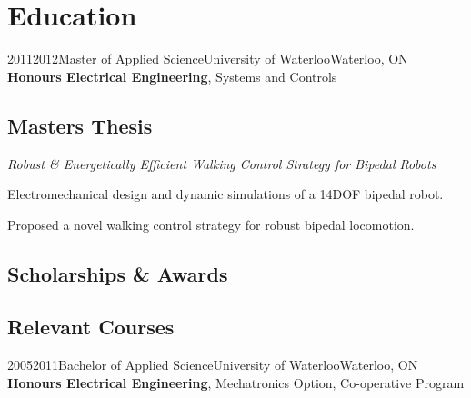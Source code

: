 \section{Education}

\vspace{2 mm}
\tlcventry
{2011}{2012}{Master of Applied Science}{University of Waterloo}{Waterloo, ON}{}
{\textbf{Honours Electrical Engineering}, Systems and Controls}

\subsection{Masters Thesis} %
	{\emph{Robust \& Energetically Efficient Walking Control Strategy for Bipedal Robots}
	\begin{tightitemize}
		\item Electromechanical design and dynamic simulations of a 14DOF bipedal robot.
		\item Proposed a novel walking control strategy for robust bipedal locomotion.
	\end{tightitemize}}
	\vspace{-6 mm}
\subsection{Scholarships \& Awards} %
\subsection{Relevant Courses} %

\vspace{5 mm}
\tlcventry
{2005}{2011}{Bachelor of Applied Science}{University of Waterloo}{Waterloo, ON}{}
{\textbf{Honours Electrical Engineering}, Mechatronics Option, Co-operative Program}

